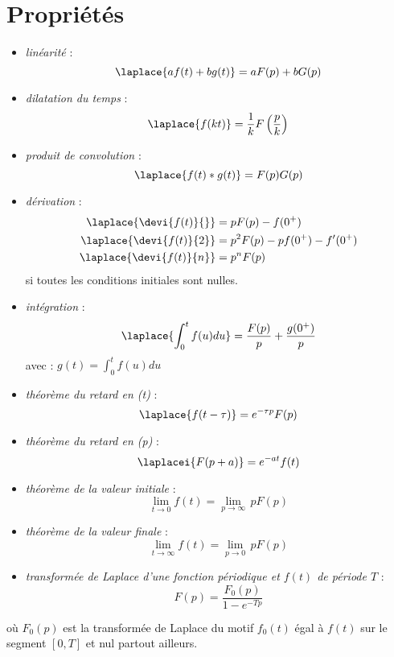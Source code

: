 \section{Propriétés} 
\begin{itemize}
\item \emph{linéarité} :
$$ 
\laplace{af(t)+bg(t)} = aF(p) + bG(p)
$$ 
\item \emph{dilatation du temps} : 
$$
\laplace{f(kt)}=\dfrac{1}{k}F\left(\dfrac{p}{k}\right)
$$
\item \emph{produit de convolution} : 
$$
\laplace{f(t)*g(t)} = F(p)G(p)
$$
\item \emph{dérivation} : 
\begin{align*}
\laplace{\devi{f(t)}{}}&=pF(p) - f(0^+) \\
\laplace{\devi{f(t)}{2}}&=p^2F(p) - pf(0^+) - f'(0^+)\\
\laplace{\devi{f(t)}{n}}&=p^nF(p) 
\end{align*}
si toutes les conditions initiales sont nulles.
\item \emph{intégration} :
$$
\laplace{\int_0^t f(u)du} = \dfrac{F(p)}{p} + \dfrac{g(0^+)}{p}
$$
avec :
$g(t)=\int_0^t f(u)du$
\item \emph{théorème du retard en (t)} :
$$
\laplace{f(t-\tau)}=e^{-\tau p}F(p)
$$
\item \emph{théorème du retard en (p)} :
$$
\laplacei{F(p+a)}=e^{-at}f(t)
$$
\item \emph{théorème de la valeur initiale} :
$$
\lim\limits_{t \to 0} f(t)=\lim\limits_{p \to \infty}\, p F(p)
$$
\item \emph{théorème de la valeur finale} :
$$
\lim\limits_{t \to \infty} f(t)=\lim\limits_{p \to 0}\,p F(p)
$$
\item \emph{transformée de Laplace d'une fonction périodique et $f(t)$ de période $T$} :
$$
        F(p) = \dfrac{F_0(p)}{1-e^{-Tp}}
$$
\end{itemize}
où $F_0(p)$ est la transformée de Laplace du motif $f_0(t)$ égal à 
$f(t)$ sur le segment $[0,T]$ et nul partout ailleurs.
